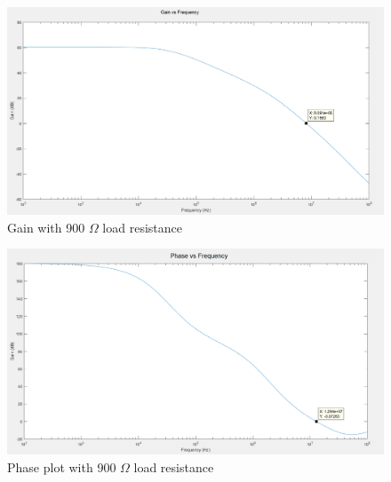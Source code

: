 \begin{figure}[H]
	\centering
	\includegraphics[width=0.7\linewidth]{CircuitDevelopment/gainfreqsim.png}
	\caption{Gain with 900 $\Omega$ load resistance}
	\label{fig:loadsweep}
\end{figure}
\begin{figure}[H]
	\centering
	\includegraphics[width=0.7\linewidth]{CircuitDevelopment/phasefreqsim.png}
	\caption{Phase plot with 900 $\Omega$ load resistance}
	\label{fig:loadsweep}
\end{figure}

